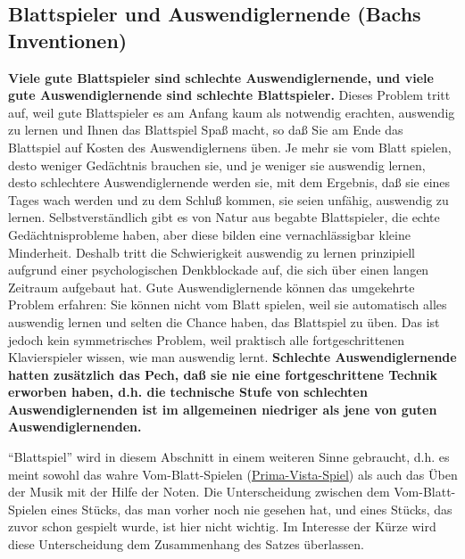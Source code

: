
\subsection{Blattspieler und Auswendiglernende (Bachs Inventionen)}
\label{c1iii6l}

\textbf{Viele gute Blattspieler sind schlechte Auswendiglernende, und viele gute Auswendiglernende sind schlechte Blattspieler.}
Dieses Problem tritt auf, weil gute Blattspieler es am Anfang kaum als notwendig erachten, auswendig zu lernen und Ihnen das Blattspiel Spaß macht, so daß Sie am Ende das Blattspiel auf Kosten des Auswendiglernens üben.
Je mehr sie vom Blatt spielen, desto weniger Gedächtnis brauchen sie, und je weniger sie auswendig lernen, desto schlechtere Auswendiglernende werden sie, mit dem Ergebnis, daß sie eines Tages wach werden und zu dem Schluß kommen, sie seien unfähig, auswendig zu lernen.
Selbstverständlich gibt es von Natur aus begabte Blattspieler, die echte Gedächtnisprobleme haben, aber diese bilden eine vernachlässigbar kleine Minderheit.
Deshalb tritt die Schwierigkeit auswendig zu lernen prinzipiell aufgrund einer psychologischen Denkblockade auf, die sich über einen langen Zeitraum aufgebaut hat.
Gute Auswendiglernende können das umgekehrte Problem erfahren: Sie können nicht vom Blatt spielen, weil sie automatisch alles auswendig lernen und selten die Chance haben, das Blattspiel zu üben.
Das ist jedoch kein symmetrisches Problem, weil praktisch alle fortgeschrittenen Klavierspieler wissen, wie man auswendig lernt.
\textbf{Schlechte Auswendiglernende hatten zusätzlich das Pech, daß sie nie eine fortgeschrittene Technik erworben haben, d.h. die technische Stufe von schlechten Auswendiglernenden ist im allgemeinen niedriger als jene von guten Auswendiglernenden.}

\enquote{Blattspiel} wird in diesem Abschnitt in einem weiteren Sinne gebraucht, d.h. es meint sowohl das wahre Vom-Blatt-Spielen (\hyperref[c030530]{Prima-Vista-Spiel}) als auch das Üben der Musik mit der Hilfe der Noten.
Die Unterscheidung zwischen dem Vom-Blatt-Spielen eines Stücks, das man vorher noch nie gesehen hat, und eines Stücks, das zuvor schon gespielt wurde, ist hier nicht wichtig.
Im Interesse der Kürze wird diese Unterscheidung dem Zusammenhang des Satzes überlassen.

